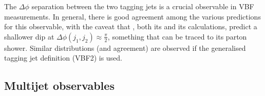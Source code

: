 {The $\Delta\phi$ separation between the two tagging jets is a crucial 
observable in VBF measurements. 
In general, there is good agreement among the various predictions for
this observable, with the caveat
 that \Sherpa, both 
its \NNLOPS and its \MEPSatNLO calculations, predict a shallower dip 
at $\Delta\phi(j_1,j_2)\approx\tfrac{\pi}{2}$, something that can be 
traced to its parton shower. Similar distributions (and agreement) 
are observed if the generalised tagging jet definition (VBF2) is used.







\clearpage
\subsection{Multijet observables}
\label{sec:hjetscomp:results:mjobs}

}
